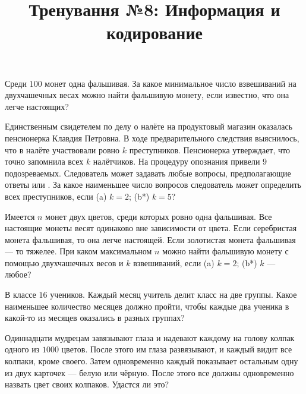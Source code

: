 



\title{Тренування №8: Информация и кодирование}
\maketitle

\begin{problem}
	Среди $100$ монет одна фальшивая. За какое минимальное число взвешиваний на двухчашечных весах можно найти фальшивую монету, если известно, что она легче настоящих?
\end{problem}

\begin{problem}
	Единственным свидетелем по делу о налёте на продуктовый магазин \guillemotright оказалась пенсионерка Клавдия Петровна. В ходе предварительного следствия выяснилось, что в налёте участвовали ровно $k$ преступников. Пенсионерка утверждает, что точно запомнила всех $k$ налётчиков. На процедуру опознания привели $9$ подозреваемых. Следователь может задавать любые вопросы, предполагающие ответы \guillemotright или \guillemotright. За какое наименьшее число вопросов следователь может определить всех преступников, если (a) $k = 2$; (b*) $k = 5$?
\end{problem}

\begin{problem}
	Имеется $n$ монет двух цветов, среди которых ровно одна фальшивая. Все настоящие монеты весят одинаково вне зависимости от цвета. Если серебристая монета фальшивая, то она легче настоящей. Если золотистая монета фальшивая --- то тяжелее. При каком максимальном $n$ можно найти фальшивую монету с помощью двухчашечных весов и $k$ взвешиваний, если (a) $k = 2$; (b*) $k$ --- любое?
\end{problem}

\begin{problem}
	В классе $16$ учеников. Каждый месяц учитель делит класс на две группы. Какое наименьшее количество месяцев должно пройти, чтобы каждые два ученика в какой-то из месяцев оказались в разных группах?
\end{problem}

\begin{problem}
	Одиннадцати мудрецам завязывают глаза и надевают каждому на голову колпак одного из $1000$ цветов. После этого им глаза развязывают, и каждый видит все колпаки, кроме своего. Затем одновременно каждый показывает остальным одну из двух карточек --- белую или чёрную. После  этого все должны одновременно назвать цвет своих колпаков. Удастся ли это?
\end{problem}

